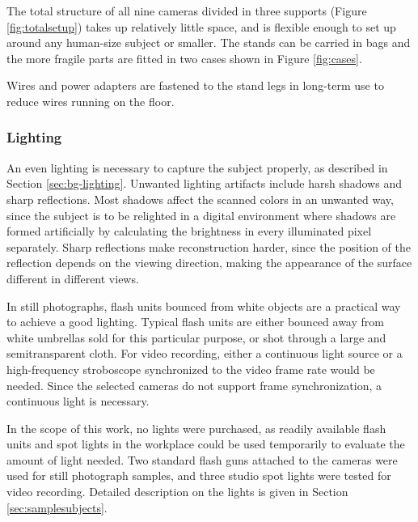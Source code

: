 The total structure of all nine cameras divided in three supports (Figure \ref{fig:totalsetup}) takes up relatively little space, and is flexible enough to set up around any human-size subject or smaller.
The stands can be carried in bags and the more fragile parts are fitted in two cases shown in Figure \ref{fig:cases}.

Wires and power adapters are fastened to the stand legs in long-term use to reduce wires running on the floor.




\subsubsection{Lighting}

An even lighting is necessary to capture the subject properly, as described in Section \ref{sec:bg-lighting}.
Unwanted lighting artifacts include harsh shadows and sharp reflections.
Most shadows affect the scanned colors in an unwanted way, since the subject is to be relighted in a digital environment where shadows are formed artificially by calculating the brightness in every illuminated pixel separately.
Sharp reflections make reconstruction harder, since the position of the reflection depends on the viewing direction, making the appearance of the surface different in different views.

In still photographs, flash units bounced from white objects are a practical way to achieve a good lighting.
Typical flash units are either bounced away from white umbrellas sold for this particular purpose, or shot through a large and semitransparent cloth.
For video recording, either a continuous light source or a high-frequency stroboscope synchronized to the video frame rate would be needed.
Since the selected cameras do not support frame synchronization, a continuous light is necessary.

In the scope of this work, no lights were purchased, as readily available flash units and spot lights in the workplace could be used temporarily to evaluate the amount of light needed.
Two standard flash guns attached to the cameras were used for still photograph samples, and three studio spot lights were tested for video recording.
Detailed description on the lights is given in Section \ref{sec:samplesubjects}.

